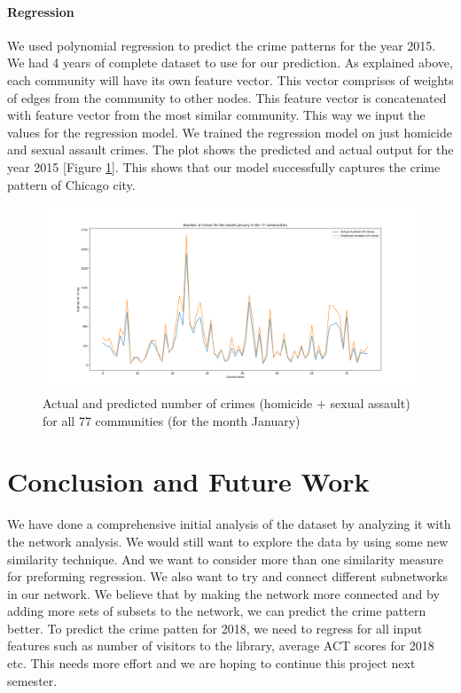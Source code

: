\documentclass{article}
\begin{document}
\paragraph{Regression}
We used polynomial regression to predict the crime patterns for the year 2015. We had 4 years of complete dataset to use for our prediction. As explained above, each community will have its own feature vector. This vector comprises of weights of edges from the community to other nodes. This feature vector is concatenated with feature vector from the most similar community. This way we input the values for the regression model. We trained the regression model on just homicide and sexual assault crimes. The plot shows the predicted and actual output for the year 2015 [Figure \ref{output}]. This shows that our model successfully captures the crime pattern of Chicago city.

\begin{figure}[H]
	\centering
	\includegraphics[trim={5cm, 1cm, 5cm, 1cm}, scale=0.3]{../Prediction/jan_predict.png}
	\caption{Actual and predicted number of crimes (homicide + sexual assault) for all 77 communities (for the month January)}
	\label{output}
\end{figure}

\section{Conclusion and Future Work}
We have done a comprehensive initial analysis of the dataset by analyzing it with the network analysis. We would still want to explore the data by using some new similarity technique. And we want to consider more than one similarity measure for preforming regression. We also want to try and connect different subnetworks in our network. We believe that by making the network more connected and by adding more sets of subsets to the network, we can predict the crime pattern better. To predict the crime patten for 2018, we need to regress for all input features such as number of visitors to the library, average ACT scores for 2018 etc. This needs more effort and we are hoping to continue this project next semester.
\end{document}
